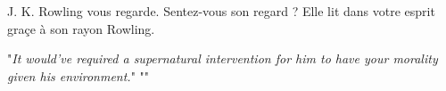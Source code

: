 J. K. Rowling vous regarde. Sentez-vous son regard ? Elle lit dans votre esprit graçe à son rayon Rowling.

\medskip
"\emph{It would’ve required a \emph{supernatural intervention} for him to have \emph{your} morality given \emph{his} environment.}"
"\emph{}"

